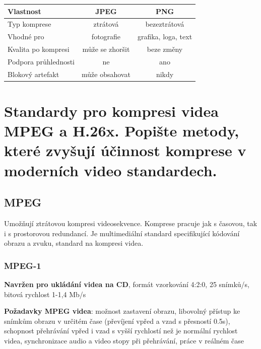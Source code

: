 \begin{table}[h]
\centering
\small
\begin{tabular}{|l|c|c|}
\hline
\textbf{Vlastnost}      & \textbf{JPEG}           & \textbf{PNG}           \\
\hline
Typ komprese            & ztrátová                & bezeztrátová           \\
\hline
Vhodné pro              & fotografie              & grafika, loga, text    \\
\hline
Kvalita po kompresi     & může se zhoršit         & beze změny             \\
\hline
Podpora průhlednosti    & ne                      & ano                    \\
\hline
Blokový artefakt               & může obsahovat          & nikdy                  \\
\hline
\end{tabular}
\end{table}



\section{Standardy pro kompresi videa MPEG a H.26x. Popište metody, které zvyšují účinnost komprese v moderních video standardech.}

\subsection{MPEG}
Umožňují ztrátovou kompresi videosekvence. Komprese pracuje jak s časovou, tak i s prostorovou redundancí. Je multimediální standard specifikující kódování obrazu a zvuku, standard na kompresi videa.

\subsubsection{MPEG-1}
\textbf{Navržen pro ukládání videa na CD}, formát vzorkování 4:2:0, 25 snímků/s, bitová rychlost 1-1,4 Mb/s

\textbf{Požadavky MPEG videa}: možnost zastavení obrazu, libovolný přístup ke snímkům obrazu v určitém čase (převíjení vpřed a vzad s přesností 0.5s), schopnost přehrávání vpřed i vzad s vyšší rychlostí než je normální rychlost videa, synchronizace audio a video stopy při přehrávání, práce v reálném čase

